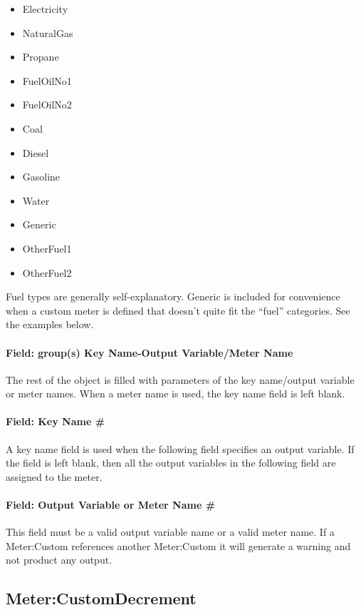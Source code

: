 \begin{itemize}
\item
  Electricity
\item
  NaturalGas
\item
  Propane
\item
  FuelOilNo1
\item
  FuelOilNo2
\item
  Coal
\item
  Diesel
\item
  Gasoline
\item
  Water
\item
  Generic
\item
  OtherFuel1
\item
  OtherFuel2
\end{itemize}

Fuel types are generally self-explanatory. Generic is included for convenience when a custom meter is defined that doesn't quite fit the ``fuel'' categories. See the examples below.

\paragraph{Field: group(s) Key Name-Output Variable/Meter Name}\label{field-groups-key-name-output-variablemeter-name}

The rest of the object is filled with parameters of the key name/output variable or meter names. When a meter name is used, the key name field is left blank.

\paragraph{Field: Key Name \#}\label{field-key-name}

A key name field is used when the following field specifies an output variable. If the field is left blank, then all the output variables in the following field are assigned to the meter.

\paragraph{Field: Output Variable or Meter Name \#}\label{field-output-variable-or-meter-name}

This field must be a valid output variable name or a valid meter name. If a Meter:Custom references another Meter:Custom it will generate a warning and not product any output.

\subsection{Meter:CustomDecrement}\label{metercustomdecrement}

